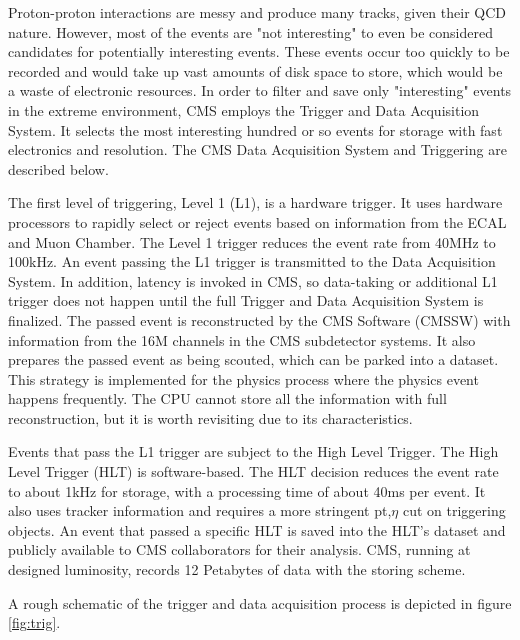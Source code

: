 Proton-proton interactions are messy and produce many tracks, given their QCD nature.
However, most of the events are "not interesting" to even be considered candidates for potentially interesting events.
These events occur too quickly to be recorded and would take up vast amounts of disk space to store, which would be a waste of electronic resources.
In order to filter and save only "interesting" events in the extreme environment, CMS employs the Trigger and Data Acquisition System.
It selects the most interesting hundred or so events for storage with fast electronics and resolution.
The CMS Data Acquisition System and Triggering are described below.

The first level of triggering, Level 1 (L1), is a hardware trigger.
It uses hardware processors to rapidly select or reject events based on information from the ECAL and Muon Chamber.
The Level 1 trigger reduces the event rate from 40MHz to 100kHz.
An event passing the L1 trigger is transmitted to the Data Acquisition System.
In addition, latency is invoked in CMS, so data-taking or additional L1 trigger does not happen until the full Trigger and Data Acquisition System is finalized.
The passed event is reconstructed by the CMS Software (CMSSW) with information from the 16M channels in the CMS subdetector systems.
It also prepares the passed event as being scouted, which can be parked into a dataset.
This strategy is implemented for the physics process where the physics event happens frequently. The CPU cannot store all the information with full reconstruction, but it is worth revisiting due to its characteristics.


Events that pass the L1 trigger are subject to the High Level Trigger.
The High Level Trigger (HLT) is software-based.
The HLT decision reduces the event rate to about 1kHz for storage, with a processing time of about 40ms per event.
It also uses tracker information and requires a more stringent pt,$\eta$ cut on triggering objects.
An event that passed a specific HLT is saved into the HLT's dataset and publicly available to CMS collaborators for their analysis.
CMS, running at designed luminosity, records 12 Petabytes of data with the storing scheme.


A rough schematic of the trigger and data acquisition process is depicted in figure \ref{fig:trig}.

